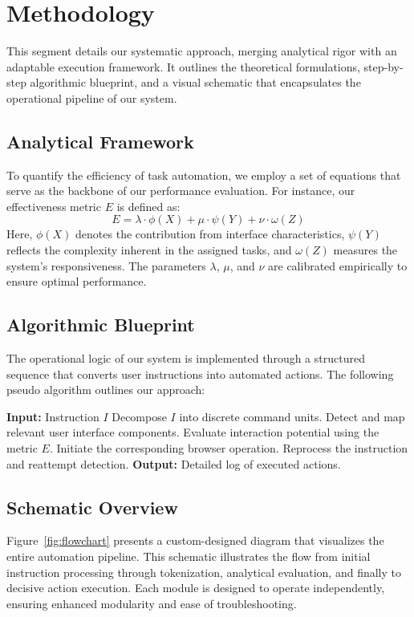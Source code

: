 \documentclass[conference]{IEEEtran}
\begin{document}
\section{Methodology}
This segment details our systematic approach, merging analytical rigor with an adaptable execution framework. It outlines the theoretical formulations, step-by-step algorithmic blueprint, and a visual schematic that encapsulates the operational pipeline of our system.

\subsection{Analytical Framework}
To quantify the efficiency of task automation, we employ a set of equations that serve as the backbone of our performance evaluation. For instance, our effectiveness metric \( E \) is defined as:
\[
E = \lambda \cdot \phi(X) + \mu \cdot \psi(Y) + \nu \cdot \omega(Z)
\]
Here, \( \phi(X) \) denotes the contribution from interface characteristics, \( \psi(Y) \) reflects the complexity inherent in the assigned tasks, and \( \omega(Z) \) measures the system's responsiveness. The parameters \( \lambda \), \( \mu \), and \( \nu \) are calibrated empirically to ensure optimal performance.

\subsection{Algorithmic Blueprint}
The operational logic of our system is implemented through a structured sequence that converts user instructions into automated actions. The following pseudo algorithm outlines our approach:

\begin{algorithmic}[1]
\STATE \textbf{Input:} Instruction \( I \)
\STATE Decompose \( I \) into discrete command units.
\STATE Detect and map relevant user interface components.
\STATE Evaluate interaction potential using the metric \( E \).
    \STATE Initiate the corresponding browser operation.
\ELSE
    \STATE Reprocess the instruction and reattempt detection.
\ENDIF
\STATE \textbf{Output:} Detailed log of executed actions.
\end{algorithmic}

\subsection{Schematic Overview}
Figure~\ref{fig:flowchart} presents a custom-designed diagram that visualizes the entire automation pipeline. This schematic illustrates the flow from initial instruction processing through tokenization, analytical evaluation, and finally to decisive action execution. Each module is designed to operate independently, ensuring enhanced modularity and ease of troubleshooting.
\end{document}
